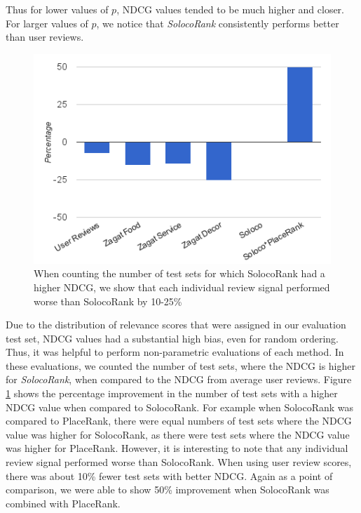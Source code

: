 Thus for lower values of $p$, NDCG values tended to be much higher and closer.
For larger values of $p$, we notice that \emph{SolocoRank} consistently performs better
than user reviews.

\begin{figure}[h]
\includegraphics[width=.5\textwidth]{fig/versusplacerank.png}
\caption{When counting the number of test sets for which SolocoRank
had a higher NDCG, we show that each individual review signal performed
worse than SolocoRank by 10-25\%}
\label{fig:versusplacerank}
\end{figure}

Due to the distribution of relevance scores that were assigned in our
evaluation test set, NDCG values had a substantial high bias, even for random ordering.
Thus, it was helpful to perform non-parametric evaluations of each method.
In these evaluations, we counted the number of test sets, where the NDCG is higher
for \emph{SolocoRank}, when compared to the NDCG from average user reviews.
Figure \ref{fig:versusplacerank} shows the percentage improvement in the 
number of test sets with a higher NDCG value when compared to SolocoRank.
For example when SolocoRank was compared to PlaceRank, there were equal
numbers of test sets where the NDCG value was higher for SolocoRank, as
there were test sets where the NDCG value was higher for PlaceRank.
However, it is interesting to note that any individual review signal performed
worse than SolocoRank.
When using user review scores, there was about 10\% fewer test sets with better
NDCG.
Again as a point of comparison, we were able to show 50\% improvement
when SolocoRank was combined with PlaceRank.

